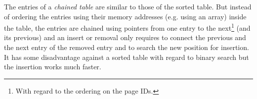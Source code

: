 	The entries of a \emph{chained table} are similar to those of the sorted table. But instead of ordering the entries using their memory addresses (e.g. using an array) inside the table, the entries are chained using pointers from one entry to the next\footnote[1]{With regard to the ordering on the page IDs.} (and its previous) and an insert or removal only requires to connect the previous and the next entry of the removed entry and to search the new position for insertion. It has some disadvantage against a sorted table with regard to binary search but the insertion works much faster.

\begin{@empty}


\end{@empty}
